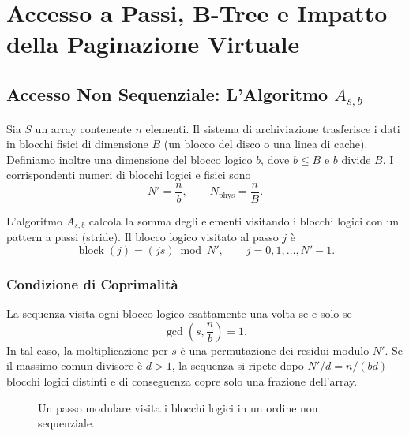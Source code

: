 \chapter{Accesso a Passi, B-Tree e Impatto della Paginazione Virtuale}
\label{cha:lecture-two}

\FloatBarrier
\section{Accesso Non Sequenziale: L'Algoritmo \texorpdfstring{$A_{s,b}$}{A-s-b}}
\label{sec:strided-access}

Sia $S$ un array contenente $n$ elementi. Il sistema di archiviazione trasferisce i dati in blocchi fisici di dimensione $B$ (un blocco del disco o una linea di cache). Definiamo inoltre una dimensione del blocco logico $b$, dove $b \leq B$ e $b$ divide $B$. I corrispondenti numeri di blocchi logici e fisici sono
\[
  N' = \frac{n}{b},
  \qquad
  N_{\mathrm{phys}} = \frac{n}{B}.
\]

L'algoritmo $A_{s,b}$ calcola la somma degli elementi visitando i blocchi logici con un pattern a passi (stride). Il blocco logico visitato al passo $j$ è
\[
  \operatorname{block}(j) = (j s) \bmod N',
  \qquad j = 0,1,\ldots,N'-1.
\]

\FloatBarrier
\subsection{Condizione di Coprimalità}
\label{subsec:coprimality}

La sequenza visita ogni blocco logico esattamente una volta se e solo se
\[
  \gcd\!\left(s,\frac{n}{b}\right)=1.
\]
In tal caso, la moltiplicazione per $s$ è una permutazione dei residui modulo $N'$. Se il massimo comun divisore è $d>1$, la sequenza si ripete dopo $N'/d = n/(bd)$ blocchi logici distinti e di conseguenza copre solo una frazione dell'array.

\begin{figure}[H]
  \centering
  \caption{Un passo modulare visita i blocchi logici in un ordine non sequenziale.}
  \label{fig:logical-stride}
\end{figure}

